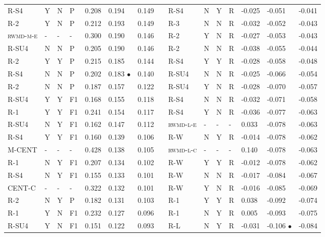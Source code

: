 \documentclass[11pt,a4paper]{article}
\begin{document}
\begin{table}[]
{\begin{tabular}{lllllllllllllll}
\textsc{R-S4} & Y & N & P & 0.208 & 0.194 & 0.149 &  & \textsc{R-S4} & N & Y & R & -0.025 & -0.051 & -0.041 \\
\textsc{R-2} & Y & N & P & 0.212 & 0.193 & 0.149 &  & \textsc{R-3} & N & N & R & -0.032 & -0.052 & -0.043 \\
\textsc{rwmd-m-e} & - & - & - & 0.300 & 0.190 & 0.146 &  & \textsc{R-2} & Y & N & R & -0.027 & -0.053 & -0.043 \\
\textsc{R-SU4} & N & N & P & 0.205 & 0.190 & 0.146 &  & \textsc{R-2} & N & N & R & -0.038 & -0.055 & -0.044 \\
\textsc{R-2} & Y & Y & P & 0.215 & 0.185 & 0.144 &  & \textsc{R-S4} & Y & Y & R & -0.028 & -0.058 & -0.048 \\
\textsc{R-S4} & N & N & P & 0.202 & 0.183 $\bullet$ & 0.140 &  & \textsc{R-SU4} & N & N & R & -0.025 & -0.066 & -0.054 \\
\textsc{R-2} & N & N & P & 0.187 & 0.157 & 0.122 &  & \textsc{R-SU4} & Y & N & R & -0.028 & -0.070 & -0.057 \\
\textsc{R-SU4} & Y & Y & F1 & 0.168 & 0.155 & 0.118 &  & \textsc{R-S4} & N & N & R & -0.032 & -0.071 & -0.058 \\
\textsc{R-1} & Y & Y & F1 & 0.241 & 0.154 & 0.117 &  & \textsc{R-S4} & Y & N & R & -0.036 & -0.077 & -0.063 \\
\textsc{R-SU4} & N & Y & F1 & 0.162 & 0.147 & 0.112 &  & \textsc{rwmd-l-e} & - & - & - & 0.033 & -0.078 & -0.063 \\
\textsc{R-S4} & Y & Y & F1 & 0.160 & 0.139 & 0.106 &  & \textsc{R-W} & N & Y & R & -0.014 & -0.078 & -0.062 \\
\textsc{M-CENT} & - & - & - & 0.428 & 0.138 & 0.105 &  & \textsc{rwmd-l-c} & - & - & - & 0.140 & -0.078 & -0.063 \\
\textsc{R-1} & N & Y & F1 & 0.207 & 0.134 & 0.102 &  & \textsc{R-W} & Y & Y & R & -0.012 & -0.078 & -0.062 \\
\textsc{R-S4} & N & Y & F1 & 0.155 & 0.133 & 0.101 &  & \textsc{R-W} & N & N & R & -0.017 & -0.084 & -0.067 \\
\textsc{CENT-C} & - & - & - & 0.322 & 0.132 & 0.101 &  & \textsc{R-W} & Y & N & R & -0.016 & -0.085 & -0.069 \\
\textsc{R-2} & N & Y & P & 0.182 & 0.131 & 0.103 &  & \textsc{R-1} & Y & Y & R & 0.038 & -0.092 & -0.074 \\
\textsc{R-1} & Y & N & F1 & 0.232 & 0.127 & 0.096 &  & \textsc{R-1} & N & Y & R & 0.005 & -0.093 & -0.075 \\
\textsc{R-SU4} & Y & N & F1 & 0.151 & 0.122 & 0.093 &  & \textsc{R-L} & N & Y & R & -0.031 & -0.106 $\bullet$ & -0.084 \\

\end{tabular}}
\end{table}
\end{document}
